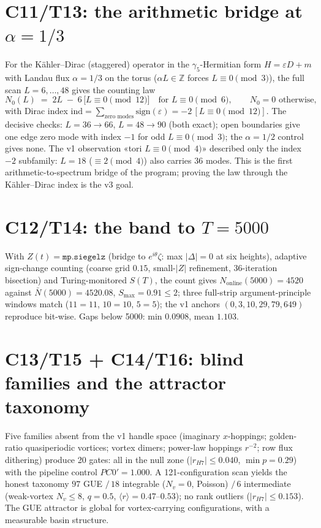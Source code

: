 \documentclass[11pt]{article}
\theoremstyle{definition}
\begin{document}
\section{C11/T13: the arithmetic bridge at $\alpha = 1/3$}
For the K\"ahler--Dirac (staggered) operator in the $\gamma_5$-Hermitian
form $H = \varepsilon D + m$ with Landau flux $\alpha = 1/3$ on the torus
($\alpha L \in \mathbb{Z}$ forces $L \equiv 0 \pmod 3$), the full scan
$L = 6,\dots,48$ gives the counting law
\[
N_0(L) \;=\; 2L \;-\; 6\,\big[L \equiv 0 \pmod{12}\big]
\quad\text{for } L \equiv 0 \pmod 6, \qquad N_0 = 0 \text{ otherwise},
\]
with Dirac index $\mathrm{ind} = \sum_{\text{zero modes}}
\mathrm{sign}(\varepsilon) = -2\,[L \equiv 0 \pmod{12}]$. The decisive
checks: $L = 36 \to 66$, $L = 48 \to 90$ (both exact); open boundaries
give one edge zero mode with index $-1$ for odd $L \equiv 0 \pmod 3$; the
$\alpha = 1/2$ control gives none. The v1 observation «tori $L \equiv 0
\pmod 4$» described only the index $-2$ subfamily: $L = 18$ ($\equiv 2
\pmod 4$) also carries $36$ modes. This is the first
arithmetic-to-spectrum bridge of the program; proving the law through the
K\"ahler--Dirac index is the v3 goal.

\section{C12/T14: the band to $T = 5000$}
With $Z(t) = \mathtt{mp.siegelz}$ (bridge to $e^{i\theta}\zeta$: max
$|\Delta| = 0$ at six heights), adaptive sign-change counting (coarse grid
$0.15$, small-$|Z|$ refinement, 36-iteration bisection) and Turing-monitored
$S(T)$, the count gives $N_{\mathrm{online}}(5000) = 4520$ against
$\bar N(5000) = 4520.08$, $S_{\max} = 0.91 \le 2$; three full-strip
argument-principle windows match ($11{=}11$, $10{=}10$, $5{=}5$); the v1
anchors $(0,3,10,29,79,649)$ reproduce bit-wise. Gaps below 5000: min
$0.0908$, mean $1.103$.

\section{C13/T15 + C14/T16: blind families and the attractor taxonomy}
Five families absent from the v1 handle space (imaginary $x$-hoppings;
golden-ratio quasiperiodic vortices; vortex dimers; power-law hoppings
$r^{-2}$; row flux dithering) produce 20 gates: all in the null zone
($|r_{H7}| \le 0.040$, $\min p = 0.29$) with the pipeline control
$PC0' = 1.000$. A 121-configuration scan yields the honest taxonomy
$97$ GUE $/\,18$ integrable ($N_v{=}0$, Poisson) $/\,6$ intermediate
(weak-vortex $N_v \le 8$, $q{=}0.5$, $\langle r\rangle = 0.47$--$0.53$);
no rank outliers ($|r_{H7}| \le 0.153$). The GUE attractor is global for
vortex-carrying configurations, with a measurable basin structure.
\end{document}
